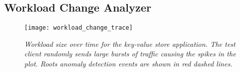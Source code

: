 

\subsection{Workload Change Analyzer}

\begin{figure}
\centering
\texttt{[image: workload\_change\_trace]}
\vspace{-0.2in}
\caption{\textit{Workload size over time for the key-value store application. The test client randomly sends
large bursts of traffic causing the spikes in the plot. Roots anomaly detection events are shown
in red dashed lines.}}
\vspace{-0.2in}
\label{fig:workload_change}
\end{figure}

